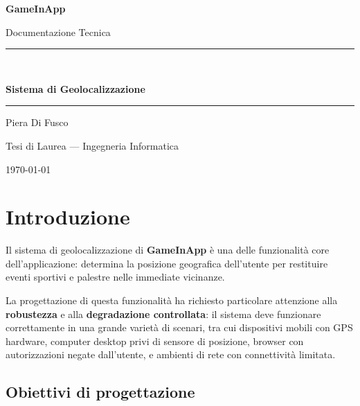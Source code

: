 \documentclass[12pt, a4paper]{article}
\begin{document}

\begin{titlepage}
  \centering
  \vspace*{3cm}
  {\huge\bfseries GameInApp\par}
  \vspace{0.5cm}
  {\Large Documentazione Tecnica\par}
  \vspace{1.5cm}
  \rule{\linewidth}{0.5pt}\\[0.4cm]
  {\LARGE\bfseries\color{primary} Sistema di Geolocalizzazione\par}
  \rule{\linewidth}{0.5pt}
  \vspace{2cm}
  {\large Piera Di Fusco\par}
  \vspace{0.5cm}
  {\normalsize Tesi di Laurea — Ingegneria Informatica\par}
  \vfill
  {\large \today\par}
\end{titlepage}

\tableofcontents
\newpage

\section{Introduzione}

Il sistema di geolocalizzazione di \textbf{GameInApp} è una delle funzionalità
core dell'applicazione: determina la posizione geografica dell'utente per
restituire eventi sportivi e palestre nelle immediate vicinanze.

La progettazione di questa funzionalità ha richiesto particolare attenzione
alla \textbf{robustezza} e alla \textbf{degradazione controllata}: il sistema
deve funzionare correttamente in una grande varietà di scenari, tra cui
dispositivi mobili con GPS hardware, computer desktop privi di sensore di
posizione, browser con autorizzazioni negate dall'utente, e ambienti di rete
con connettività limitata.

\subsection{Obiettivi di progettazione}
\end{document}
